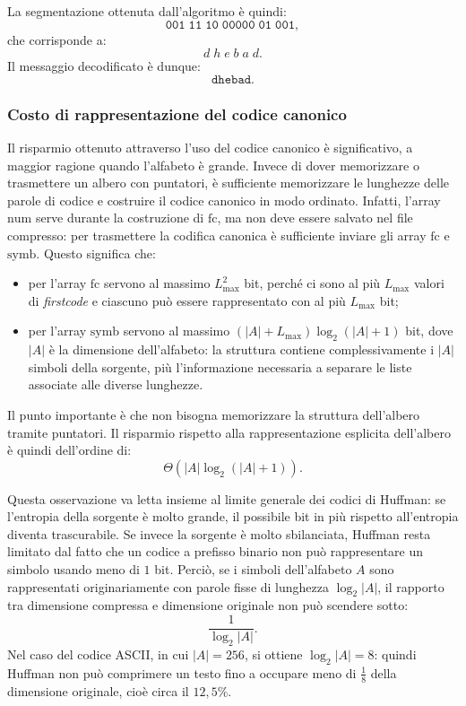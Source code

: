 \documentclass{article}
\theoremstyle{definition}
\numberwithin{equation}{section}
\begin{document}
La segmentazione ottenuta dall'algoritmo è quindi:
\[
    \texttt{001}\;\texttt{11}\;\texttt{10}\;\texttt{00000}\;\texttt{01}\;\texttt{001},
\]
che corrisponde a:
\[
    d\;h\;e\;b\;a\;d.
\]
Il messaggio decodificato è dunque:
\[
    \texttt{dhebad}.
\]

\subsubsection{Costo di rappresentazione del codice canonico}
Il risparmio ottenuto attraverso l'uso del codice canonico è significativo, a maggior ragione quando l'alfabeto è grande. Invece di dover memorizzare o trasmettere un albero con puntatori, è sufficiente memorizzare le lunghezze delle parole di codice e costruire il codice canonico in modo ordinato. Infatti, l'array $\text{num}$ serve durante la costruzione di $\text{fc}$, ma non deve essere salvato nel file compresso: per trasmettere la codifica canonica è sufficiente inviare gli array $\text{fc}$ e $\text{symb}$. Questo significa che:
\begin{itemize}
    \item per l'array $\text{fc}$ servono al massimo $L_{\max}^2$ bit, perché ci sono al più $L_{\max}$ valori di \emph{firstcode} e ciascuno può essere rappresentato con al più $L_{\max}$ bit;
    \item per l'array $\text{symb}$ servono al massimo $(|A| + L_{\max})\log_2(|A|+1)$ bit, dove $|A|$ è la dimensione dell'alfabeto: la struttura contiene complessivamente i $|A|$ simboli della sorgente, più l'informazione necessaria a separare le liste associate alle diverse lunghezze.
\end{itemize}

Il punto importante è che non bisogna memorizzare la struttura dell'albero tramite puntatori. Il risparmio rispetto alla rappresentazione esplicita dell'albero è quindi dell'ordine di:
\[
    \Theta(|A|\log_2(|A|+1)).
\]

Questa osservazione va letta insieme al limite generale dei codici di Huffman: se l'entropia della sorgente è molto grande, il possibile bit in più rispetto all'entropia diventa trascurabile. Se invece la sorgente è molto sbilanciata, Huffman resta limitato dal fatto che un codice a prefisso binario non può rappresentare un simbolo usando meno di $1$ bit. Perciò, se i simboli dell'alfabeto $A$ sono rappresentati originariamente con parole fisse di lunghezza $\log_2 |A|$, il rapporto tra dimensione compressa e dimensione originale non può scendere sotto:
\[
    \frac{1}{\log_2 |A|}.
\]
Nel caso del codice ASCII, in cui $|A|=256$, si ottiene $\log_2 |A|=8$: quindi Huffman non può comprimere un testo fino a occupare meno di $\frac{1}{8}$ della dimensione originale, cioè circa il $12{,}5\%$.
\end{document}
